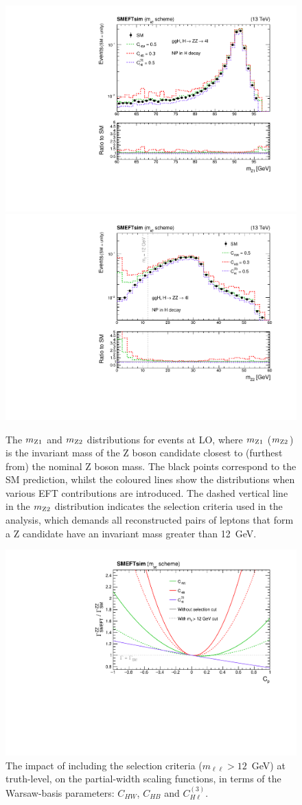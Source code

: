 \begin{figure}
  \centering
  \includegraphics[width=.49\textwidth]{Figures/eft/distributions/M1.pdf}
  \includegraphics[width=.49\textwidth]{Figures/eft/distributions/M2.pdf}
  \caption[Kinematic distributions in the \Hfl decay channel]
  {
    The $m_{\rm{Z1}}$ and $m_{\rm{Z2}}$ distributions for \Hfl events at LO, where $m_{\rm{Z1}}$ ($m_{\rm{Z2}}$) is the invariant mass of the Z boson candidate closest to (furthest from) the nominal Z boson mass. The black points correspond to the SM prediction, whilst the coloured lines show the distributions when various EFT contributions are introduced. The dashed vertical line in the $m_{\rm{Z2}}$ distribution indicates the selection criteria used in the \Hfl analysis, which demands all reconstructed pairs of leptons that form a Z candidate have an invariant mass greater than 12~GeV.
  }
  \label{fig:acceptance_h4l}
\end{figure}

\begin{figure}
  \centering
  \includegraphics[width=.7\textwidth]{Figures/eft/scaling_functions/sf_hzz_acceptance.pdf}
  \caption[Acceptance effects in the \Hfl partial width]
  {
    The impact of including the selection criteria ($m_{\ell\ell}>12$~GeV) at truth-level, on the \Hfl partial-width scaling functions, in terms of the Warsaw-basis parameters: $C_{HW}$, $C_{HB}$ and $C^{(3)}_{H\ell}$.
  }
  \label{fig:acceptance_h4l_sf}
\end{figure}

